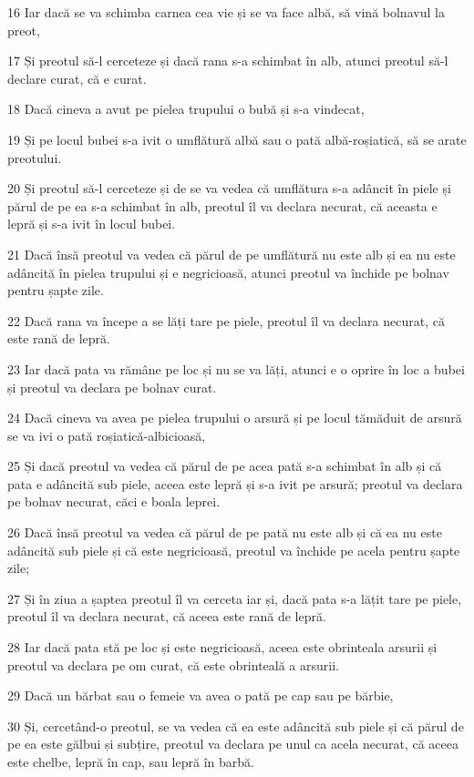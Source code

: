 \par 16 Iar dacă se va schimba carnea cea vie și se va face albă, să vină bolnavul la preot,
\par 17 Și preotul să-l cerceteze și dacă rana s-a schimbat în alb, atunci preotul să-l declare curat, că e curat.
\par 18 Dacă cineva a avut pe pielea trupului o bubă și s-a vindecat,
\par 19 Și pe locul bubei s-a ivit o umflătură albă sau o pată albă-roșiatică, să se arate preotului.
\par 20 Și preotul să-l cerceteze și de se va vedea că umflătura s-a adâncit în piele și părul de pe ea s-a schimbat în alb, preotul îl va declara necurat, că aceasta e lepră și s-a ivit în locul bubei.
\par 21 Dacă însă preotul va vedea că părul de pe umflătură nu este alb și ea nu este adâncită în pielea trupului și e negricioasă, atunci preotul va închide pe bolnav pentru șapte zile.
\par 22 Dacă rana va începe a se lăți tare pe piele, preotul îl va declara necurat, că este rană de lepră.
\par 23 Iar dacă pata va rămâne pe loc și nu se va lăți, atunci e o oprire în loc a bubei și preotul va declara pe bolnav curat.
\par 24 Dacă cineva va avea pe pielea trupului o arsură și pe locul tămăduit de arsură se va ivi o pată roșiatică-albicioasă,
\par 25 Și dacă preotul va vedea că părul de pe acea pată s-a schimbat în alb și că pata e adâncită sub piele, aceea este lepră și s-a ivit pe arsură; preotul va declara pe bolnav necurat, căci e boala leprei.
\par 26 Dacă însă preotul va vedea că părul de pe pată nu este alb și că ea nu este adâncită sub piele și că este negricioasă, preotul va închide pe acela pentru șapte zile;
\par 27 Și în ziua a șaptea preotul îl va cerceta iar și, dacă pata s-a lățit tare pe piele, preotul îl va declara necurat, că aceea este rană de lepră.
\par 28 Iar dacă pata stă pe loc și este negricioasă, aceea este obrinteala arsurii și preotul va declara pe om curat, că este obrinteală a arsurii.
\par 29 Dacă un bărbat sau o femeie va avea o pată pe cap sau pe bărbie,
\par 30 Și, cercetând-o preotul, se va vedea că ea este adâncită sub piele și că părul de pe ea este gălbui și subțire, preotul va declara pe unul ca acela necurat, că aceea este chelbe, lepră în cap, sau lepră în barbă.
